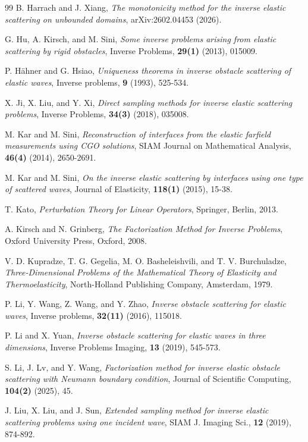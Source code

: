\documentclass[11pt,reqno,twoside]{amsart}
\theoremstyle{definition}
\theoremstyle{remark}
\numberwithin{equation}{section}
\begin{document}
\begin{thebibliography}{99}
B. Harrach and J. Xiang, {\it The monotonicity method for the inverse elastic scattering on unbounded domains}, arXiv:2602.04453 (2026).

G. Hu, A. Kirsch, and M. Sini, {\it Some inverse problems arising from elastic scattering by rigid obstacles}, Inverse Problems, \textbf{29(1)} (2013), 015009.

P. H\"ahner and G. Hsiao, {\it Uniqueness theorems in inverse obstacle scattering of elastic waves}, Inverse problems, \textbf{9} (1993), 525-534.

X. Ji, X. Liu, and Y. Xi, {\it Direct sampling methods for inverse elastic scattering problems}, Inverse Problems, \textbf{34(3)} (2018), 035008.


M. Kar and M. Sini, {\it Reconstruction of interfaces from the elastic farfield measurements using CGO solutions}, SIAM Journal on Mathematical Analysis, \textbf{46(4)} (2014), 2650-2691.

M. Kar and M. Sini, {\it On the inverse elastic scattering by interfaces using one type of scattered waves}, Journal of Elasticity, \textbf{118(1)} (2015), 15-38.

T. Kato, {\it Perturbation Theory for Linear Operators}, Springer, Berlin, 2013.

A. Kirsch and N. Grinberg, {\it The Factorization Method for Inverse Problems}, Oxford University Press, Oxford, 2008.

 V. D. Kupradze, T. G. Gegelia, M. O. Basheleishvili,  and T. V. Burchuladze, {\it Three-Dimensional Problems of the Mathematical Theory of Elasticity and Thermoelasticity},  North-Holland Publishing Company, Amsterdam, 1979.

P. Li, Y. Wang, Z. Wang, and Y. Zhao, {\it Inverse obstacle scattering for elastic waves}, Inverse problems, \textbf{32(11)} (2016), 115018.

P. Li and X. Yuan, {\it Inverse obstacle scattering for elastic waves in three dimensions}, Inverse Problems Imaging, \textbf{13} (2019), 545-573.

S. Li, J. Lv, and Y. Wang, {\it Factorization method for inverse elastic obstacle scattering with Neumann boundary condition}, Journal of Scientific Computing, \textbf{104(2)} (2025), 45.

J. Liu, X. Liu, and J. Sun, {\it Extended sampling method for inverse elastic scattering problems using one incident wave}, SIAM J. Imaging Sci., \textbf{12} (2019), 874-892.


\end{thebibliography}
\end{document}
